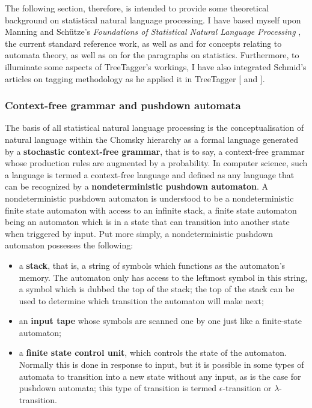 The following section, therefore, is intended to provide some theoretical
background on statistical natural language processing. I have based myself upon
Manning and Schütze's \textit{Foundations of Statistical Natural Language
Processing} \citep{manning1999}, the current standard reference work, as well
as \citet{koshy2004} and \citet{hopcroft2001} for concepts relating to automata
theory, as well as on \citet{bod2004} for the paragraphs on statistics.
Furthermore, to illuminate some aspects of TreeTagger's workings, I have also
integrated Schmid's articles on tagging methodology as he applied it in
TreeTagger [\citeyear{schmid1994} and \citeyear{schmid1995}]. 

\subsubsection{Context-free grammar and pushdown automata} %
\label{sub:formallang}

The basis of all statistical natural language processing is the
conceptualisation of natural language within the Chomsky hierarchy as a formal
language generated by a \textbf{stochastic context-free grammar}, that is to say, a
context-free grammar whose production rules are augmented by a probability. In
computer science, such a language is termed a context-free language and defined
as any language that can be recognized by a \textbf{nondeterministic pushdown
automaton}. A nondeterministic pushdown automaton is understood to be a
nondeterministic finite state automaton with access to an infinite stack, a
finite state automaton being an automaton which is in a state that can
transition into another state when triggered by input. Put more simply, a
nondeterministic pushdown automaton possesses the following:

\begin{itemize} 
  
  \item a \textbf{stack}, that is, a string of symbols which functions as the
    automaton's memory. The automaton only has access to the leftmost symbol in
    this string, a symbol which is dubbed the top of the stack; the top of the
    stack can be used to determine which transition the automaton will make
    next;
    
  \item an \textbf{input tape} whose symbols are scanned one by one just like a
    finite-state automaton; 
    
    \item a \textbf{finite state control unit}, which controls the state of the
      automaton. Normally this is done in response to input, but it is possible
      in some types of automata to transition into a new state without any
      input, as is the case for pushdown automata; this type of transition is
      termed $\epsilon$-transition or $\lambda$-transition.
    
\end{itemize}

